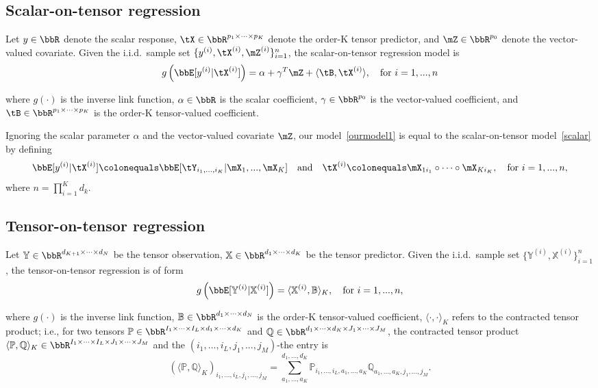 \documentclass[11pt]{article}
\newcommand{\of}[1]{\left(#1\right)}
\theoremstyle{plain}
\theoremstyle{definition}
\begin{document}
\subsection{Scalar-on-tensor regression}
Let $y \in \bbR$ denote the scalar response, $\tX \in \bbR^{p_1 \times \cdots \times p_K}$ denote the order-K tensor predictor, and $\mZ \in \bbR^{p_0}$ denote the vector-valued covariate. Given the i.i.d.\ sample set $\{y^{(i)}, \tX^{(i)}, \mZ^{(i)}\}_{i=1}^n$,  the scalar-on-tensor regression model is
\begin{equation}\label{scalar}
	g \of{\bbE[y^{(i)} | \tX^{(i)}]}  = \alpha + \gamma^T \mZ + \langle \tB, \tX^{(i)}  \rangle, \quad \text{for } i  = 1 ,...,n
\end{equation}

where $g(\cdot)$ is the inverse link function, $\alpha \in \bbR$ is the scalar coefficient, $\gamma \in \bbR^{p_0}$ is the vector-valued coefficient, and $\tB \in \bbR^{p_1 \times \cdots \times p_K}$ is the order-K tensor-valued coefficient.

Ignoring the scalar parameter $\alpha$ and the vector-valued covariate $\mZ$, our model~\eqref{ourmodel1} is equal to the scalar-on-tensor model~\eqref{scalar} by defining
\begin{equation}
	\bbE[y^{(i)} | \tX^{(i)}] \colonequals \bbE[\tY_{i_1,...,i_K} |\mX_1 ,...,\mX_K ] \quad \text{and} \quad \tX^{(i)} \colonequals \mX_{1i_1} \circ \cdots \circ \mX_{K i_K}, \quad \text{for } i = 1,..., n,
\end{equation}
where $n = \prod_{i=1}^K d_k$.

\subsection{Tensor-on-tensor regression}
Let $\mathbb{Y} \in \bbR^{ d_{K+1} \times \cdots \times d_{N}}$ be the tensor observation, $\mathbb{X} \in \bbR^{ d_1 \times \cdots \times d_K}$ be the tensor predictor. Given the i.i.d.\ sample set $\{\mathbb{Y}^{(i)}, \mathbb{X}^{(i)} \}_{i=1}^n$,  the tensor-on-tensor regression is of form
\begin{equation}\label{tensor}
	g \of{\bbE[\mathbb{Y}^{(i)} | \mathbb{X}^{(i)}]} = \langle \mathbb{X}^{(i)}, \mathbb{B}   \rangle_K, \quad \text{for } i = 1,...,n,
\end{equation}

where $g(\cdot)$ is the inverse link function, $\mathbb{B} \in \bbR^{d_1 \times \cdots \times d_N}$ is the order-K tensor-valued coefficient, $\langle \cdot, \cdot \rangle_K$ refers to the contracted tensor product; i.e., for two tensors $\mathbb{P} \in \bbR^{I_1 \times \cdots \times I_L \times d_1 \times \cdots \times d_K}$ and $\mathbb{Q} \in \bbR^{d_1 \times \cdots \times d_K \times J_1 \times \cdots \times J_M}$, the contracted tensor product $\langle \mathbb{P}, \mathbb{Q} \rangle_K \in \bbR^{I_1\times \cdots \times I_L \times J_1 \times \cdots \times J_M}$ and the $(i_1,...,i_L, j_1,...,j_M)$-the entry is
\begin{equation}
	(\langle \mathbb{P}, \mathbb{Q} \rangle_K)_{i_1,...,i_L, j_1,...,j_M} = \sum_{a_1,...,a_K}^{d_1,...,d_K} \mathbb{P}_{i_1,...,i_L, a_1,...,a_K} \mathbb{Q}_{a_1,...,a_K, j_1,...,j_M}.
\end{equation}
\end{document}
